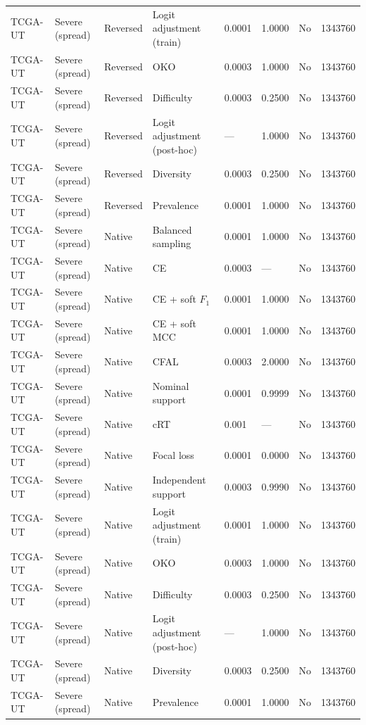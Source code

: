 \begin{longtable}{lllllllr}
TCGA-UT & Severe (spread) & Reversed & Logit adjustment (train) & 0.0001 & 1.0000 & No & 1343760 \\
TCGA-UT & Severe (spread) & Reversed & OKO & 0.0003 & 1.0000 & No & 1343760 \\
TCGA-UT & Severe (spread) & Reversed & Difficulty & 0.0003 & 0.2500 & No & 1343760 \\
TCGA-UT & Severe (spread) & Reversed & Logit adjustment (post-hoc) & --- & 1.0000 & No & 1343760 \\
TCGA-UT & Severe (spread) & Reversed & Diversity & 0.0003 & 0.2500 & No & 1343760 \\
TCGA-UT & Severe (spread) & Reversed & Prevalence & 0.0001 & 1.0000 & No & 1343760 \\
TCGA-UT & Severe (spread) & Native & Balanced sampling & 0.0001 & 1.0000 & No & 1343760 \\
TCGA-UT & Severe (spread) & Native & CE & 0.0003 & --- & No & 1343760 \\
TCGA-UT & Severe (spread) & Native & CE + soft $F_1$ & 0.0001 & 1.0000 & No & 1343760 \\
TCGA-UT & Severe (spread) & Native & CE + soft MCC & 0.0001 & 1.0000 & No & 1343760 \\
TCGA-UT & Severe (spread) & Native & CFAL & 0.0003 & 2.0000 & No & 1343760 \\
TCGA-UT & Severe (spread) & Native & Nominal support & 0.0001 & 0.9999 & No & 1343760 \\
TCGA-UT & Severe (spread) & Native & cRT & 0.001 & --- & No & 1343760 \\
TCGA-UT & Severe (spread) & Native & Focal loss & 0.0001 & 0.0000 & No & 1343760 \\
TCGA-UT & Severe (spread) & Native & Independent support & 0.0003 & 0.9990 & No & 1343760 \\
TCGA-UT & Severe (spread) & Native & Logit adjustment (train) & 0.0001 & 1.0000 & No & 1343760 \\
TCGA-UT & Severe (spread) & Native & OKO & 0.0003 & 1.0000 & No & 1343760 \\
TCGA-UT & Severe (spread) & Native & Difficulty & 0.0003 & 0.2500 & No & 1343760 \\
TCGA-UT & Severe (spread) & Native & Logit adjustment (post-hoc) & --- & 1.0000 & No & 1343760 \\
TCGA-UT & Severe (spread) & Native & Diversity & 0.0003 & 0.2500 & No & 1343760 \\
TCGA-UT & Severe (spread) & Native & Prevalence & 0.0001 & 1.0000 & No & 1343760 \\
\end{longtable}
